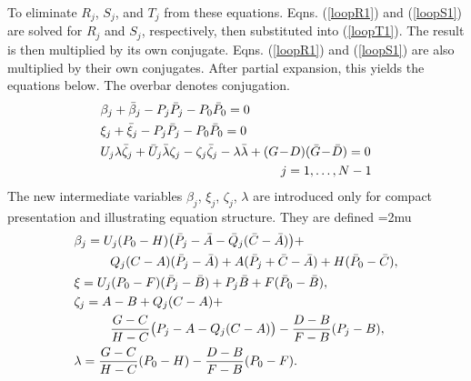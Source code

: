 \documentclass[journal]{IEEEtran}
\def\*#1{\bar{#1}} %
\begin{document}
To eliminate $R_j$, $S_j$, and $T_j$ from these equations.
Eqns. (\ref{loopR1}) and (\ref{loopS1}) are solved for $R_j$ and $S_j$, respectively, then substituted into (\ref{loopT1}).  The result is then multiplied by its own conjugate.  Eqns. (\ref{loopR1}) and (\ref{loopS1}) are also multiplied by their own conjugates.  After partial expansion, this yields the equations below.  The overbar denotes conjugation.
\begin{align}
&\beta_j + \*\beta_j - P_j\*P_j - P_0\*P_0 = 0 \label{loopbeta1}\\
&\xi_j + \*\xi_j - P_j\*P_j - P_0\*P_0 = 0 \label{loopxi1}\\
&U_j\lambda\*\zeta_j + \*U_j\*\lambda\zeta_j - \zeta_j\*\zeta_j - \lambda\*\lambda + (G\!-\!D)(\*G\!-\!\*D) = 0 \label{loopzeta1} \\
&\hspace{50mm} j=1,\ldots,N-1 \nonumber
\end{align}
The new intermediate variables $\beta_j$, $\xi_j$, $\zeta_j$, $\lambda$ are introduced only for compact presentation and illustrating equation structure.  They are defined
\medmuskip=2mu
\begin{align}
&\beta_j = U_j(P_0-H)\big(\*P_j-\*A-\*Q_j(\*C-\*A)\big) + \nonumber\\
&\hspace{10mm} Q_j(C-A)(\*P_j-\*A) + A(\*P_j+\*C-\*A) + H(\*P_0-\*C), \nonumber\\
&\xi = U_j(P_0-F)(\*P_j-\*B) + P_j\*B + F(\*P_0-\*B), \nonumber\\
&\zeta_j = A-B+Q_j(C-A) + \nonumber\\
&\hspace{10mm} \frac{G-C}{H-C}\big(P_j-A-Q_j(C-A)\big) - \frac{D-B}{F-B}(P_j-B), \nonumber\\
&\lambda = \frac{G-C}{H-C}(P_0-H)-\frac{D-B}{F-B}(P_0-F). \label{expansion1}
\end{align}
\end{document}
